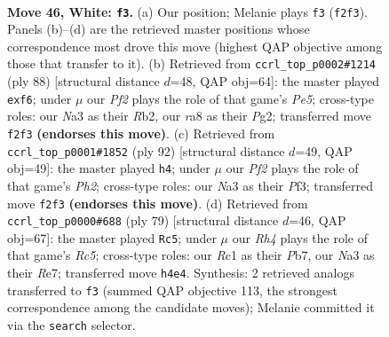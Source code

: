 \documentclass[11pt]{article}
\begin{document}
\clearpage

\begin{figure}[p]\centering
\begin{subfigure}{0.46\textwidth}\centering
\resizebox{\linewidth}{!}{%
\newchessgame
\chessboard[
  setfen={r7/pn6/1pr1p1kp/5p2/2P4R/N1B1P3/P4PP1/2R2K2 w - - 6 46},
  showmover=false,
  pgfstyle=straightmove, color=movearrow, markmove={f2-f3}
]}
\caption{}
\end{subfigure}\hfill
\begin{subfigure}{0.46\textwidth}\centering
\resizebox{\linewidth}{!}{%
\newchessgame
\chessboard[
  setfen={r5k1/4p2p/6p1/1rpPPp2/4n3/1P2N2P/1R4PK/4R3 w - f6 0 45},
  showmover=false,
  pgfstyle=straightmove, color=movearrow, markmove={e5-f6}
]}
\caption{}
\end{subfigure}
\\[4pt]
\begin{subfigure}{0.46\textwidth}\centering
\resizebox{\linewidth}{!}{%
\newchessgame
\chessboard[
  setfen={5k2/r4p2/3pr1pp/P1pR4/4P3/5PP1/R4K1P/8 w - - 5 47},
  showmover=false,
  pgfstyle=straightmove, color=movearrow, markmove={h2-h4}
]}
\caption{}
\end{subfigure}\hfill
\begin{subfigure}{0.46\textwidth}\centering
\resizebox{\linewidth}{!}{%
\newchessgame
\chessboard[
  setfen={8/1pk1r1pB/3n3p/p3p2P/P1r3P1/R4PK1/2P1R3/8 b - - 5 40},
  showmover=false,
  pgfstyle=straightmove, color=movearrow, markmove={c4-c5}
]}
\caption{}
\end{subfigure}
\caption{\textbf{Move 46, White: \texttt{f3}.} (a) Our position; Melanie plays \texttt{f3} (\texttt{f2f3}). Panels (b)--(d) are the retrieved master positions whose correspondence most drove this move (highest QAP objective among those that transfer to it). (b) Retrieved from \texttt{ccrl\_top\_p0002\#1214} (ply 88) [structural distance $d$=48, QAP obj=64]: the master played \texttt{exf6}; under $\mu$ our \emph{Pf2} plays the role of that game's \emph{Pe5}; cross-type roles: our \emph{N}a3 as their \emph{R}b2, our \emph{r}a8 as their \emph{P}g2; transferred move \texttt{f2f3} \textbf{(endorses this move)}. (c) Retrieved from \texttt{ccrl\_top\_p0001\#1852} (ply 92) [structural distance $d$=49, QAP obj=49]: the master played \texttt{h4}; under $\mu$ our \emph{Pf2} plays the role of that game's \emph{Ph2}; cross-type roles: our \emph{N}a3 as their \emph{P}f3; transferred move \texttt{f2f3} \textbf{(endorses this move)}. (d) Retrieved from \texttt{ccrl\_top\_p0000\#688} (ply 79) [structural distance $d$=46, QAP obj=67]: the master played \texttt{Rc5}; under $\mu$ our \emph{Rh4} plays the role of that game's \emph{Rc5}; cross-type roles: our \emph{R}c1 as their \emph{P}b7, our \emph{N}a3 as their \emph{R}e7; transferred move \texttt{h4e4}. Synthesis: 2 retrieved analogs transferred to \texttt{f3} (summed QAP objective 113, the strongest correspondence among the candidate moves); Melanie committed it via the \texttt{search} selector.}
\label{fig:thought-m90}
\end{figure}
\end{document}
